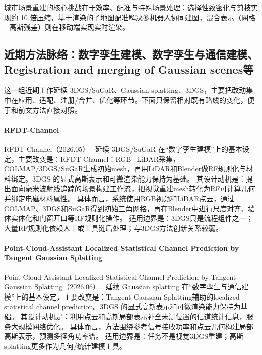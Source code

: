 \begin{takeaway}
城市场景重建的核心挑战在于效率、配准与特殊场景处理：选择性致密化与剪枝实现约 10 倍压缩，基于渲染的子地图配准解决多机器人协同建图，混合表示（网格+高斯残差）则在移动端实现实时渲染。
\end{takeaway}


\subsection{近期方法脉络：数字孪生建模、数字孪生与通信建模、Registration and merging of Gaussian scenes等}

这一组近期工作延续 3DGS/SuGaR、Gaussian splatting、3DGS，主要把改动集中在应用、适配、注册/合并、优化等环节。下面只保留相对既有路线的变化，便于和前文方法直接对照。

\paragraph{RFDT-Channel}
RFDT-Channel（2026.05）~\cite{2606_01261} 延续 3DGS/SuGaR 在“数字孪生建模”上的基本设定，主要改变是：RFDT-Channel：RGB+LiDAR采集，COLMAP/3DGS/SuGaR生成初始mesh，再用LiDAR和Blender做RF规则化与材料绑定。3DGS 的显式高斯表示和可微渲染能力保持为基础。
其设计动机是：提出面向毫米波射线追踪的场景构建工作流，把视觉重建mesh转化为RF可计算几何并绑定电磁材料属性。
具体而言，系统使用RGB视频和LiDAR点云，通过COLMAP、3DGS和SuGaR得到初始三角网格，再在Blender中进行尺度对齐、墙体实体化和门窗开口等RF规则化操作。
适用边界是：3DGS只是流程组件之一；大量RF规则化依赖人工或工具链后处理；与3DGS方法创新关系较弱。

\paragraph{Point-Cloud-Assistant Localized Statistical Channel Prediction by Tangent Gaussian Splatting}
Point-Cloud-Assistant Localized Statistical Channel Prediction by Tangent Gaussian Splatting（2026.06）~\cite{2606_18734} 延续 Gaussian splatting 在“数字孪生与通信建模”上的基本设定，主要改变是：Tangent Gaussian Splatting辅助的localized statistical channel prediction。3DGS 的显式高斯表示和可微渲染能力保持为基础。
其设计动机是：利用点云和高斯局部表示补全未测位置的信道统计信息，服务大规模网络优化。
具体而言，方法围绕参考信号接收功率和点云几何构建局部高斯表示，预测多径角功率谱。
适用边界是：任务不是视觉3DGS重建；高斯splatting更多作为几何/统计建模工具。

